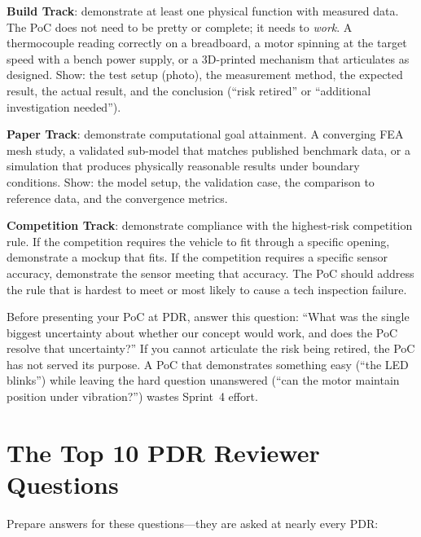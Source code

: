 \textbf{Build Track}: demonstrate at least one physical function with measured data. The PoC does not need to be pretty or complete; it needs to \emph{work}. A thermocouple reading correctly on a breadboard, a motor spinning at the target speed with a bench power supply, or a 3D-printed mechanism that articulates as designed. Show: the test setup (photo), the measurement method, the expected result, the actual result, and the conclusion (``risk retired'' or ``additional investigation needed'').

\textbf{Paper Track}: demonstrate computational goal attainment. A converging FEA mesh study, a validated sub-model that matches published benchmark data, or a simulation that produces physically reasonable results under boundary conditions. Show: the model setup, the validation case, the comparison to reference data, and the convergence metrics.

\textbf{Competition Track}: demonstrate compliance with the highest-risk competition rule. If the competition requires the vehicle to fit through a specific opening, demonstrate a mockup that fits. If the competition requires a specific sensor accuracy, demonstrate the sensor meeting that accuracy. The PoC should address the rule that is hardest to meet or most likely to cause a tech inspection failure.

\begin{keyconceptbox}
Before presenting your PoC at PDR, answer this question: ``What was the single biggest uncertainty about whether our concept would work, and does the PoC resolve that uncertainty?'' If you cannot articulate the risk being retired, the PoC has not served its purpose. A PoC that demonstrates something easy (``the LED blinks'') while leaving the hard question unanswered (``can the motor maintain position under vibration?'') wastes Sprint~4 effort.
\end{keyconceptbox}



\section{The Top 10 PDR Reviewer Questions}
Prepare answers for these questions---they are asked at nearly every PDR:

